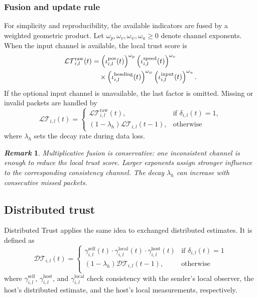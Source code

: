 \documentclass[letterpaper,journal]{IEEEtran}
\def\LT{\mathcal{LT}} %
\def\DT{\mathcal{DT}} %
\newtheorem{remark}{\it Remark}%
\begin{document}
\subsubsection{Fusion and update rule}
For simplicity and reproducibility, the available indicators are fused by a weighted geometric product. Let $\omega_p,\omega_v,\omega_\psi,\omega_u\ge0$ denote channel exponents. When the input channel is available, the local trust score is
\begin{align}
    \LT_{i,l}^{\mathrm{raw}}(t)
    &=\left(\iota_{i,l}^{\text{pos}}(t)\right)^{\omega_p}
    \left(\iota_{i,l}^{\text{speed}}(t)\right)^{\omega_v}
    \notag\\
    &\quad\times
    \left(\iota_{i,l}^{\text{heading}}(t)\right)^{\omega_\psi}
    \left(\iota_{i,l}^{\text{input}}(t)\right)^{\omega_u}.
    \label{eq_local_trust_product}
\end{align}
If the optional input channel is unavailable, the last factor is omitted. Missing or invalid packets are handled by
\begin{equation}
    \LT_{i,l}(t) =
    \left\{ \begin{array}{lc}
        \LT_{i,l}^{\mathrm{raw}}(t),  &  \text{if } \delta_{i,l}(t) = 1, \\
        (1 - \lambda_h)\LT_{i,l}(t-1), & \text{otherwise}
    \end{array}\right.
    \label{eq_local_trust_update}
\end{equation}
where $\lambda_h$ sets the decay rate during data loss.
\begin{remark}
    Multiplicative fusion is conservative: one inconsistent channel is enough to reduce the local trust score. Larger exponents assign stronger influence to the corresponding consistency channel. The decay $\lambda_h$ can increase with consecutive missed packets.
\end{remark}

\subsection{Distributed trust}
Distributed Trust applies the same idea to exchanged distributed estimates. It is defined as
\begin{equation}
        \DT_{i,l}(t)  = \begin{cases}
       \gamma_{i,l}^{\text{self}}(t) \cdot \gamma_{i,l}^{\text{local}}(t) \cdot
        \gamma_{i,l}^{\text{host}}(t)   &  \text{if } \delta_{i,l}(t) = 1 \\
        (1 - \lambda_h)\DT_{i,l}(t-1), & \text{otherwise} \\
    \end{cases}
\end{equation}
where $\gamma_{i,l}^{\text{self}}$, $\gamma_{i,l}^{\text{host}}$, and $\gamma_{i,l}^{\text{local}}$ check consistency with the sender's local observer, the host's distributed estimate, and the host's local measurements, respectively.
\end{document}
